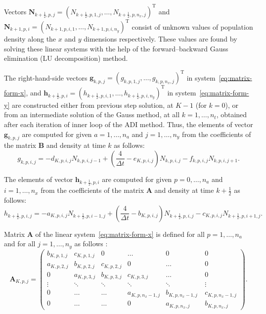 \noindent Vectors $\mathbf{N}_{k+\frac{1}{2},p,j}=(N_{k+\frac{1}{2},p,1,j},\dots,N_{k+\frac{1}{2},p,n_x,j})^{\text{T}}$ and $\mathbf{N}_{k+1,p,i}=(N_{k+1,p,i,1},\dots,N_{k+1,p,i,n_y})^{\text{T}}$ consist of unknown values of population density along the $x$ and $y$ dimensions respectively. These values are found by solving these linear systems with the help of the forward--backward Gauss elimination (LU decomposition) method. 

The right-hand-side vectors $\mathbf{g}_{k,p,j}=(g_{k,p,1,j},\dots,g_{k,p,n_x,j})^{\text{T}}$ in system~\eqref{eq:matrix-form-x}, and $\mathbf{h}_{k+\frac{1}{2},p,i}=(h_{k+\frac{1}{2},p,i,1},\dots,h_{k+\frac{1}{2},p,i,n_y})^{\text{T}}$ in system~\eqref{eq:matrix-form-y} are constructed either from previous step solution, at $K-1$ (for $k=0$), or from an intermediate solution of the Gauss method, at all $k=1,\dots,n_t$, obtained after each iteration of inner loop of the ADI method. Thus, the elements of vector $\mathbf{g}_{k,p,j}$ are computed for given $a=1,\dots,n_a$ and $j=1,\dots,n_y$ from the coefficients of the matrix $\mathbf{B}$ and density at time $k$ as follows:
\begin{equation}
  \label{eq:second-members-x}
  g_{k,p,i,j} = 
  - d_{K,p,i,j}N_{k,p,i,j-1}
  + \left( \dfrac{4}{\Delta t} - e_{K,p,i,j}\right)N_{k,p,i,j} 
  - f_{k,p,i,j}N_{k,p,i,j+1}.
\end{equation}

\noindent The elements of vector $\mathbf{h}_{k+\frac{1}{2},p,i}$ are computed for given $p=0,\dots,n_a$ and $i=1,\dots,n_x$ from the coefficients of the matrix $\mathbf{A}$ and density at time $k+\frac{1}{2}$ as follows:
\begin{equation}
  \label{eq:second-members-y}
  h_{k+\frac{1}{2},p,i,j} = 
  -a_{K,p,i,j}N_{k+\frac{1}{2},p,i-1,j}
  +\left(\frac{4}{\Delta t}-b_{K,p,i,j}\right)N_{k+\frac{1}{2},p,i,j}
  -c_{K,p,i,j}N_{k+\frac{1}{2},p,i+1,j}.
\end{equation}

\noindent Matrix $\mathbf{A}$ of the linear system~\eqref{eq:matrix-form-x} is defined for all $p=1,\dots,n_a$ and for all $j=1,\dots,n_y$ as follows \citep*[notations of][]{Sibert-Fournier}:
\begin{equation}
  \label{eq:A-matrix}
  \mathbf{A}_{K,p,j}=\left(
    \begin{array}{cccccc}
      b_{K,p,1,j} & c_{K,p,1,j} & 0 & \ldots & 0 & 0\\
      a_{K,p,2,j} & b_{K,p,2,j} & c_{K,p,2,j} & 0 & \ldots & 0\\
      0 & a_{K,p,3,j} & b_{K,p,3,j} & c_{K,p,3,j} & \ldots & 0\\
      \vdots & \ddots & \ddots & \ddots & \ddots & \vdots\\
      0 & \ldots & \ldots & a_{K,p,n_x-1,j} & b_{K,p,n_x-1,j}\ & c_{K,p,n_x-1,j}\\
      0 & \ldots & \ldots & 0 & a_{K,p,n_x,j} & b_{K,p,n_x,j}
    \end{array}
  \right).
\end{equation}


